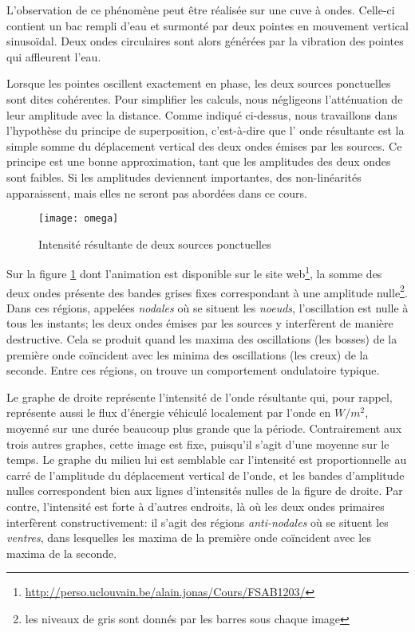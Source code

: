 L'observation de ce phénomène peut être réalisée sur une cuve à ondes. Celle-ci contient un bac rempli d'eau et surmonté par deux pointes en mouvement vertical sinusoïdal. Deux ondes circulaires sont alors générées par la vibration des pointes qui affleurent l'eau.

Lorsque les pointes oscillent exactement en phase, les deux sources ponctuelles sont dites cohérentes. Pour simplifier les calculs, nous négligeons l'atténuation de leur amplitude avec la distance. Comme indiqué ci-dessus, nous travaillons dans l'hypothèse du principe de superposition, c'est-à-dire que l' onde résultante est la simple somme du déplacement vertical des deux ondes émises par les sources. Ce principe est une bonne approximation, tant que les amplitudes des deux ondes sont faibles. Si les amplitudes deviennent importantes, des non-linéarités apparaissent, mais elles ne seront pas abordées dans ce cours. 

\begin{figure}[htb]
\centering
\texttt{[image: omega]}
\caption{Intensité résultante de deux sources ponctuelles}
\label{omega}
\end{figure}

Sur la figure \ref{omega} dont l'animation est disponible sur le site web\footnote{\url{http://perso.uclouvain.be/alain.jonas/Cours/FSAB1203/}}, la somme des deux ondes présente des bandes grises fixes correspondant à une amplitude nulle\footnote{les niveaux de gris sont donnés par les barres sous chaque image}. Dans ces régions, appelées \textit{nodales} où se situent les \textit{noeuds}, l'oscillation est nulle à tous les instants; les deux ondes émises par les sources y interfèrent de manière destructive. Cela se produit quand les maxima des oscillations (les bosses) de la première onde coïncident avec les minima des oscillations (les creux) de la seconde. Entre ces régions, on trouve un comportement ondulatoire typique.

Le graphe de droite représente l'intensité de l'onde résultante qui, pour rappel, représente aussi le flux d'énergie véhiculé localement par l'onde en $W/m^2$, moyenné sur une durée beaucoup plus grande que la période. Contrairement aux trois autres graphes, cette image est fixe, puisqu'il s'agit d'une moyenne sur le temps. Le graphe du milieu lui est semblable car l'intensité est proportionnelle au carré de l'amplitude du déplacement vertical de l'onde, et les bandes d'amplitude nulles correspondent bien aux lignes d'intensités nulles de la figure de droite. Par contre, l'intensité est forte à d'autres endroits, là où les deux ondes primaires interfèrent constructivement: il s'agit des régions \textit{anti-nodales} où se situent les \textit{ventres}, dans lesquelles les maxima de la première onde coïncident avec les maxima de la seconde.\\
 
